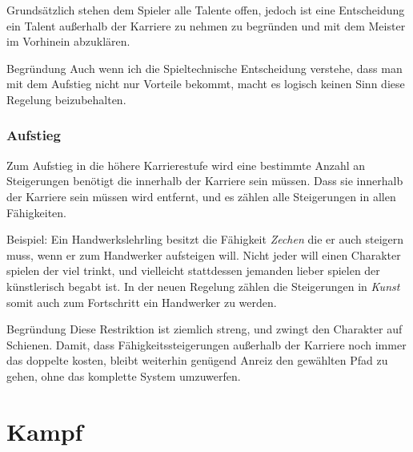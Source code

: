 \documentclass[letterpaper,twocolumn,nodeprecatedcode]{article}
\begin{document}
Grundsätzlich stehen dem Spieler alle Talente offen, jedoch ist eine Entscheidung ein Talent außerhalb der Karriere zu nehmen zu begründen und mit dem Meister im Vorhinein abzuklären.

\begin{DndComment}{Begründung}
  Auch wenn ich die Spieltechnische Entscheidung verstehe, dass man mit dem Aufstieg nicht nur Vorteile bekommt, macht es logisch keinen Sinn diese Regelung beizubehalten.
\end{DndComment}

\subsubsection{Aufstieg}
Zum Aufstieg in die höhere Karrierestufe wird eine bestimmte Anzahl an Steigerungen benötigt die innerhalb der Karriere sein müssen.
Dass sie innerhalb der Karriere sein müssen wird entfernt, und es zählen alle Steigerungen in allen Fähigkeiten.

Beispiel: Ein Handwerkslehrling besitzt die Fähigkeit \textit{Zechen} die er auch steigern muss, wenn er zum Handwerker aufsteigen will. Nicht jeder will einen Charakter spielen der viel trinkt, und vielleicht stattdessen jemanden lieber spielen der künstlerisch begabt ist. In der neuen Regelung zählen die Steigerungen in \textit{Kunst} somit auch zum Fortschritt ein Handwerker zu werden.

\begin{DndComment}{Begründung}
  Diese Restriktion ist ziemlich streng, und zwingt den Charakter auf Schienen. Damit, dass Fähigkeitssteigerungen außerhalb der Karriere noch immer das doppelte kosten, bleibt weiterhin genügend Anreiz den gewählten Pfad zu gehen, ohne das komplette System umzuwerfen.
\end{DndComment}

\newpage
\section{Kampf}
\end{document}

